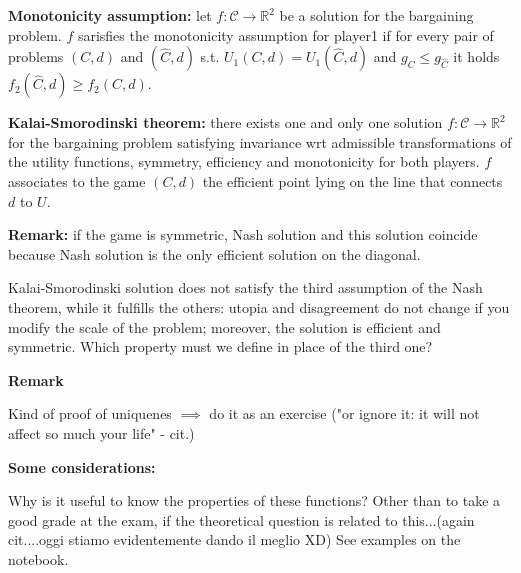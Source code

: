 \bigskip
\noindent \textbf{Monotonicity assumption:} let $f: \mathcal{C} \rightarrow \mathbb{R}^2$ be a solution for the bargaining problem. $f$ sarisfies the monotonicity assumption for player1 if for every pair of problems $(C,d)$ and $(\hat{C},d)$ s.t. $U_1(C,d) = U_1(\hat{C},d)$ and $g_C \leq g_{\hat{C}}$ it holds $f_2(\hat{C},d) \geq f_2(C,d)$.

\bigskip
\noindent \textbf{Kalai-Smorodinski theorem:} there exists one and only one solution $f: \mathcal{C} \rightarrow \mathbb{R}^2$ for the bargaining problem satisfying invariance wrt admissible transformations of the utility functions, symmetry, efficiency and monotonicity for both players. $f$ associates to the game $(C,d)$ the efficient point lying on the line that connects $d$ to $U$.

\bigskip
\noindent \textbf{Remark:} if the game is symmetric, Nash solution and this 
solution coincide because Nash solution is the only efficient solution on the 
diagonal.

\noindent Kalai-Smorodinski solution does not satisfy the third assumption of 
the Nash theorem, while it fulfills the others: utopia and disagreement do not 
change if you modify the scale of the problem; moreover, the solution is 
efficient and symmetric. Which property must we define in place of the third 
one?

\bigskip
\noindent \textbf{Remark}

\noindent Kind of proof of uniquenes $\implies$ do it as an exercise {(\huge "or 
ignore it: it will not affect so much your life" - cit.)}

\bigskip
\noindent \textbf{Some considerations:}

\noindent Why is it useful to know the properties of these functions? 
{\huge Other than to take a good grade at the exam, if the theoretical question 
is related to this...(again cit....oggi stiamo evidentemente dando il meglio 
XD)} 
See examples on the notebook.

%

%

